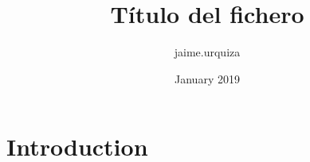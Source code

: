 \documentclass{IEEEtran}
\title{Título del fichero}
\author{jaime.urquiza }
\date{January 2019}
\begin{document}
\maketitle

\section{Introduction}

\cite{Vardi}

{}

\end{document}
